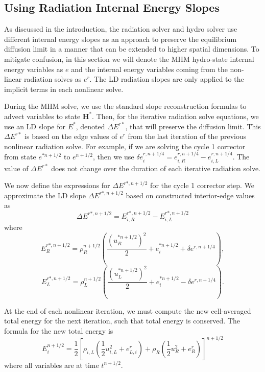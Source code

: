 \documentclass[preprint,12pt]{elsarticle}
\renewcommand{\H}{\mathbf{H}}
\begin{document}
\subsection{Using Radiation Internal Energy Slopes}
\label{sec:e_slopes}

As discussed in the introduction, the radiation solver and hydro solver use different
internal energy slopes as an approach to preserve the equilibrium diffusion limit in a
manner that can be extended to higher spatial dimensions.
To mitigate confusion, in this section we will denote the MHM hydro-state internal energy variables as $e$ and
the internal energy variables coming from the non-linear radiation solves as $e^r$.  The
LD radiation slopes are only applied to the implicit terms in each
nonlinear solve.

During the MHM solve, we
use the standard slope reconstruction formulas to advect variables to
state $\H^*$.  Then, for the iterative radiation
solve equations, we use an LD slope for $E^*$, denoted $\Delta E^{r*}$, that will preserve the diffusion
limit.  This $\Delta E^{r*}$ is based on the edge values of $e^r$ from the last iteration of the previous
nonlinear radiation solve.  For example, if we are solving the cycle 1 corrector from
state $e^{*n+1/2}$ to
$e^{n+1/2}$, then we use $\delta e_i^{r,n+1/4}=e^{r,n+1/4}_{i,R} - e^{r,n+1/4}_{i,L}$.  The value of $\Delta
E^{r*}$ does not change over the duration of each iterative radiation solve.

We now define the expressions for $\Delta E^{r*,n+1/2}$ for the cycle 1 corrector step.  We
approximate the LD slope $\Delta E^{r*,n+1/2}$ based on constructed interior-edge
values as
\begin{equation}
    \Delta E^{r*,n+1/2} = E^{r*,n+1/2}_{i,R} - E^{r*,n+1/2}_{i,L}
\end{equation}
where 
\begin{equation}\label{estarr}
    E^{r*,n+1/2}_R = \rho^{n+1/2}_R\left(\frac{(u_R^{*n+1/2})^2}{2} + e^{*n+1/2}_i +
    \delta e^{r,n+1/4}\right),
\end{equation}
\begin{equation}\label{estarl}
    E^{r*,n+1/2}_L = \rho^{n+1/2}_L\left(\frac{(u_L^{*n+1/2})^2}{2} + e^{*n+1/2}_i -
    \delta e^{r,n+1/4}\right).
\end{equation}

At the end of each nonlinear iteration, we must compute the new cell-averaged total energy
for the next iteration, such that total energy is conserved. The formula for the new total energy is
\begin{equation}\label{ei}
    E^{n+1/2}_i = \frac{1}{2}\left[\rho_{i,L}\left(\frac{1}{2}u_{i,L}^2 + e_{L,i}^r\right)
    +\rho_R\left(\frac{1}{2}u_R^2 + e_R^r\right)\right]^{n+1/2}
\end{equation}
where all variables are at time $t^{n+1/2}$. 
\end{document}
